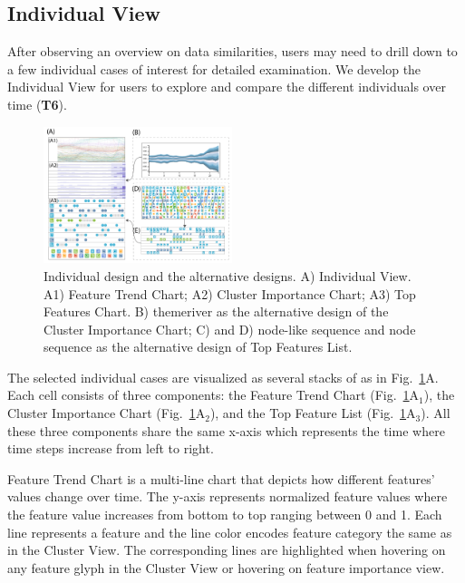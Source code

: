 \subsection{Individual View}
After observing an overview on data similarities, users may need to drill down to a few individual cases of interest for detailed examination.
We develop the Individual View for users to explore and compare the different individuals over time (\textbf{T6}).


\begin{figure}[t]
	\centering
    \includegraphics[width=0.49\textwidth]{pictures/design/alternative_design.pdf}
	\vspace{-3mm}
	\caption{Individual design and the alternative designs. A) Individual View. A1) Feature Trend Chart; A2) Cluster Importance Chart; A3) Top Features Chart. B) themeriver as the alternative design of the Cluster Importance Chart; C) and D) node-like sequence and node sequence as the alternative design of Top Features List.}
	\label{fig:individual_view}
	\vspace{-4mm}
\end{figure}

The selected individual cases are visualized as several stacks of  as in Fig.~\ref{fig:individual_view}A.
Each cell consists of three components: the Feature Trend Chart (Fig.~\ref{fig:individual_view}A$_1$), the Cluster Importance Chart (Fig.~\ref{fig:individual_view}A$_2$), and the Top Feature List (Fig.~\ref{fig:individual_view}A$_3$).
All these three components share the same x-axis which represents the time where time steps increase from left to right.

Feature Trend Chart is a multi-line chart that depicts how different features' values change over time. 
The y-axis represents normalized feature values where the feature value increases from bottom to top ranging between 0 and 1.
Each line represents a feature and the line color encodes feature category the same as in the Cluster View.
The corresponding lines are highlighted when hovering on any feature glyph in the Cluster View or hovering on feature importance view. 

